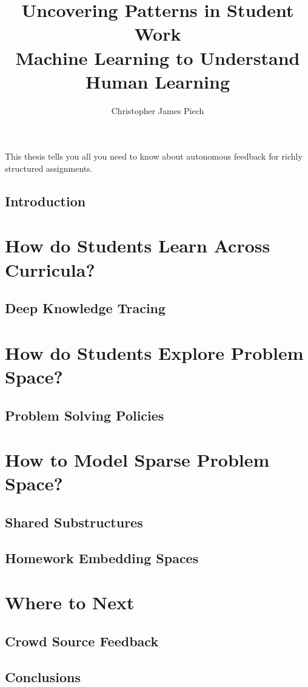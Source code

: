 \documentclass{report}
\begin{document}
\title{Uncovering Patterns in Student Work\\
            Machine Learning to Understand Human Learning}
\author{Christopher James Piech}
 
\beforepreface
{}
This thesis tells you all you need to know about autonomous feedback for richly structured assignments.


\afterpreface

\chapter{Introduction}


\part{How do Students Learn Across Curricula?}

\chapter{Deep Knowledge Tracing}


\part{How do Students Explore Problem Space?}

\chapter{Problem Solving Policies}


\part{How to Model Sparse Problem Space?}

\chapter{Shared Substructures}


\chapter{Homework Embedding Spaces}


\part{Where to Next}

\chapter{Crowd Source Feedback}


\chapter{Conclusions}



 
\end{document}
